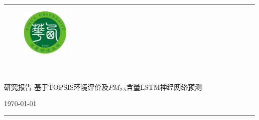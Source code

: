 \documentclass[UTF8]{ctexart}
\begin{document}
\begin{titlepage}
    \centering


    \rule{\textwidth}{1pt}   %

    \vspace{0.2\textheight}  %

    \begin{figure}[H]
        \centering
        \includegraphics[width=0.2\textwidth]{./picture/Xihua_University_logo.png}
    \end{figure}
    \begin{center}
		\quad \\
		\quad \\
		\heiti \fontsize{45}{17} 研究报告
		\vskip 3.5cm
		\heiti {}  基于TOPSIS环境评价及$PM_{2.5}$含量LSTM神经网络预测
	\end{center}






    

    
    \vfill  %

    {\large \today}
    \vspace{0.1\textheight}  %


    \rule{\textwidth}{1pt}  %

  \end{titlepage}
\end{document}
